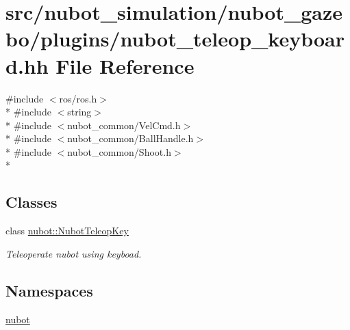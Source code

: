 \hypertarget{nubot__teleop__keyboard_8hh}{\section{src/nubot\-\_\-simulation/nubot\-\_\-gazebo/plugins/nubot\-\_\-teleop\-\_\-keyboard.hh File Reference}
\label{nubot__teleop__keyboard_8hh}
}
{\ttfamily \#include $<$ros/ros.\-h$>$}\\*
{\ttfamily \#include $<$string$>$}\\*
{\ttfamily \#include $<$nubot\-\_\-common/\-Vel\-Cmd.\-h$>$}\\*
{\ttfamily \#include $<$nubot\-\_\-common/\-Ball\-Handle.\-h$>$}\\*
{\ttfamily \#include $<$nubot\-\_\-common/\-Shoot.\-h$>$}\\*
\subsection*{Classes}
\begin{DoxyCompactItemize}
\item 
class \hyperlink{classnubot_1_1NubotTeleopKey}{nubot\-::\-Nubot\-Teleop\-Key}
\begin{DoxyCompactList}\small\item\em Teleoperate nubot using keyboad. \end{DoxyCompactList}\end{DoxyCompactItemize}
\subsection*{Namespaces}
\begin{DoxyCompactItemize}
\item 
\hyperlink{namespacenubot}{nubot}
\end{DoxyCompactItemize}
